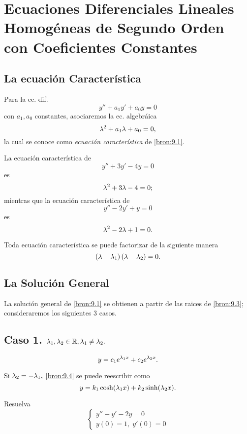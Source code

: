 \section{Ecuaciones Diferenciales Lineales Homog\'eneas de Segundo Orden con Coeficientes Constantes}

\subsection{La ecuaci\'on Caracter\'istica}


Para la ec. dif.
\[
	\label{bron:9.1}
	y''+a_{1}y'+a_{0}y=0
\]
con $a_{1},a_{0}$ constantes, asociaremos la ec. algebráica
\[
	\label{bron:9.2}
	\lambda^{2}+a_{1}\lambda+a_{0}=0,
\]
la cual se conoce como \emph{ecuaci\'on caracter\'istica} de \eqref{bron:9.1}.



\begin{resuelto}
	La ecuaci\'on caracter\'istica de $$y''+3y'-4y=0$$ es  $$\lambda^{2}+3\lambda-4=0;$$  mientras que la ecuaci\'on caracter\'istica de $$y''-2y'+y=0$$ es  $$\lambda^{2}-2\lambda+1=0.$$
\end{resuelto}




Toda ecuaci\'on caracter\'istica se puede factorizar de la siguiente manera
\[
	\label{bron:9.3}
	\left( \lambda- \lambda_{1} \right)\left( \lambda-\lambda_{2} \right)=0.
\]



\subsection{La Soluci\'on General}


La soluci\'on general de \eqref{bron:9.1} se obtienen a partir de las raices de \eqref{bron:9.3}; consideraremos los siguientes 3 casos.




\subsection{Caso 1. $\lambda_{1}, \lambda_{2}\in \mathbb{R}, \lambda_{1}\neq \lambda_{2}.$ }

\[
	\label{bron:9.4}
	y=c_{1}e^{\lambda_{1}x}+c_{2}e^{\lambda_{2}x}.
\]

Si $\lambda_{2}=-\lambda_{1},$ \eqref{bron:9.4} se puede reescribir como
$$
y=k_{1}\cosh(\lambda_{1}x)+k_{2}\sinh(\lambda_{2}x).
$$




\begin{resuelto}
	\label{bron:exmp:9.1}
	Resuelva
	$$\begin{cases}
		y''-y'-2y=0\\
		y(0)=1, \; y'(0)=0
	\end{cases}
	$$
\end{resuelto}






